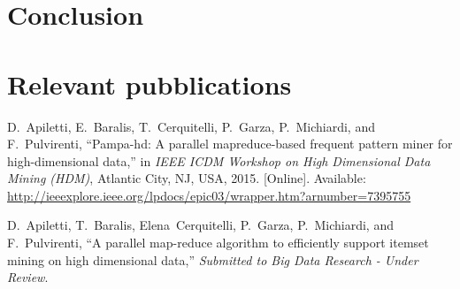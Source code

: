 \section{Conclusion} \label{Conclusion}


\section{Relevant pubblications}



D.~Apiletti, E.~Baralis, T.~Cerquitelli, P.~Garza, P.~Michiardi, and
  F.~Pulvirenti, ``Pampa-hd: A parallel mapreduce-based frequent pattern miner
  for high-dimensional data,'' in \emph{IEEE ICDM Workshop on High Dimensional
  Data Mining (HDM)}, Atlantic City, NJ, USA, 2015. [Online]. Available:
  \url{http://ieeexplore.ieee.org/lpdocs/epic03/wrapper.htm?arnumber=7395755}


D.~Apiletti, T.~Baralis, Elena~Cerquitelli, P.~Garza, P.~Michiardi, and
  F.~Pulvirenti, ``A parallel map-reduce algorithm to efficiently support
  itemset mining on high dimensional data,'' \emph{Submitted to Big Data
  Research - Under Review}.
